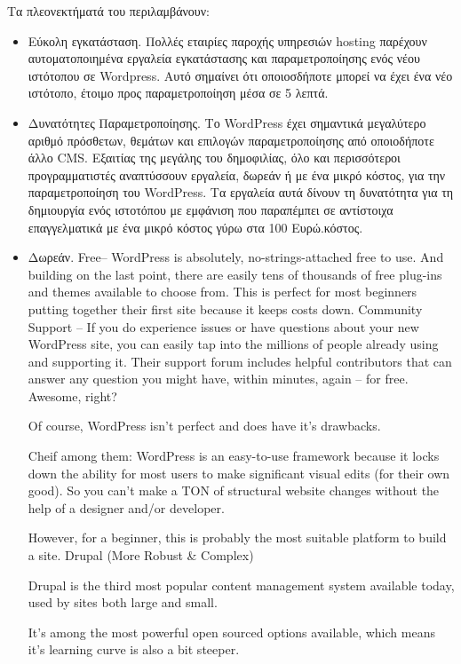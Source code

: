 \documentclass[12pt]{report}
\begin{document}
Τα πλεονεκτήματά του περιλαμβάνουν:
\begin{itemize}
\item Εύκολη εγκατάσταση. Πολλές εταιρίες παροχής υπηρεσιών \textlatin{hosting} παρέχουν αυτοματοποιημένα εργαλεία εγκατάστασης και παραμετροποίησης ενός νέου ιστότοπου σε \textlatin{Wordpress}. Αυτό σημαίνει ότι οποιοσδήποτε μπορεί να έχει ένα νέο ιστότοπο, έτοιμο προς παραμετροποίηση μέσα σε 5 λεπτά.

\item Δυνατότητες Παραμετροποίησης. Το \textlatin{WordPress} έχει σημαντικά μεγαλύτερο αριθμό πρόσθετων, θεμάτων και επιλογών παραμετροποίησης από οποιοδήποτε άλλο \textlatin{CMS}. Εξαιτίας της μεγάλης του δημοφιλίας, όλο και περισσότεροι προγραμματιστές αναπτύσσουν εργαλεία, δωρεάν ή με ένα μικρό κόστος, για την παραμετροποίηση του \textlatin{WordPress}. Τα εργαλεία αυτά δίνουν τη δυνατότητα για τη δημιουργία ενός ιστοτόπου με εμφάνιση που παραπέμπει σε αντίστοιχα επαγγελματικά με ένα μικρό κόστος γύρω στα 100 Ευρώ.κόστος.

\item Δωρεάν. 
Free– WordPress is absolutely, no-strings-attached free to use. And building on the last point, there are easily tens of thousands of free plug-ins and themes available to choose from. This is perfect for most beginners putting together their first site because it keeps costs down.
Community Support – If you do experience issues or have questions about your new WordPress site, you can easily tap into the millions of people already using and supporting it. Their support forum includes helpful contributors that can answer any question you might have, within minutes, again – for free. Awesome, right?

Of course, WordPress isn’t perfect and does have it’s drawbacks.

Cheif among them: WordPress is an easy-to-use framework because it locks down the ability for most users to make significant visual edits (for their own good). So you can’t make a TON of structural website changes without the help of a designer and/or developer.

However, for a beginner, this is probably the most suitable platform to build a site.
  Drupal (More Robust & Complex)

Drupal is the third most popular content management system available today, used by sites both large and small.

It’s among the most powerful open sourced options available, which means it’s learning curve is also a bit steeper.


\end{itemize}
\end{document}
